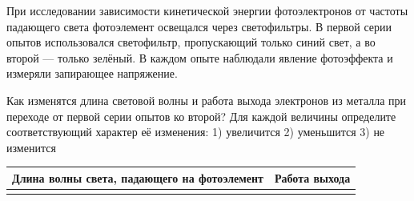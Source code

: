 \begin{taskbasic}[code={\label{task:photo_blue_to_green_lambda_and_work}}]
При исследовании зависимости кинетической энергии фотоэлектронов от частоты падающего света фотоэлемент освещался через светофильтры. В первой серии опытов использовался светофильтр, пропускающий только синий свет, а во второй --- только зелёный. В каждом опыте наблюдали явление фотоэффекта и измеряли запирающее напряжение.

Как изменятся длина световой волны и работа выхода электронов из металла при переходе от первой серии опытов ко второй? Для каждой величины определите соответствующий характер её изменения:
1) увеличится
2) уменьшится
3) не изменится

\nopagebreak\smallskip
\begin{center}
\small
\begin{tabular}{|c|c|}
\hline
Длина волны света, падающего на фотоэлемент & Работа выхода \\ \hline
 & \\ \hline
\end{tabular}
\end{center}

\end{taskbasic}


